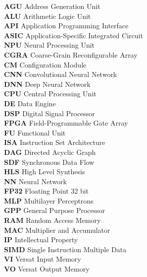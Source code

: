 	\noindent
	\textbf{AGU} Address Generation Unit\\
	\textbf{ALU} Arithmetic Logic Unit\\
	\textbf{API} Application Programming Interface\\
	\textbf{ASIC} Application-Specific Integrated Circuit\\
	\textbf{NPU} Neural Processing Unit \\
	\textbf{CGRA} Coarse-Grain Reconfigurable Array\\
	\textbf{CM} Configuration Module\\
	\textbf{CNN} Convolutional Neural Network\\
	\textbf{DNN} Deep Neural Network\\
	\textbf{CPU} Central Processing Unit\\
	\textbf{DE} Data Engine\\
	\textbf{DSP} Digital Signal Processor\\
	\textbf{FPGA} Field-Programmable Gate Array\\
	\textbf{FU} Functional Unit\\
	\textbf{ISA} Instruction Set Architecture\\
	\textbf{DAG} Directed Acyclic Graph\\
	\textbf{SDF} Synchronous Data Flow\\
	\textbf{HLS} High Level Synthesis\\
	\textbf{NN} Neural Network\\
	\textbf{FP32} Floating Point 32 bit\\
	\textbf{MLP} Multilayer Perceptrons\\
	\textbf{GPP} General Purpose Processor\\
	\textbf{RAM} Random Access Memory\\
	\textbf{MAC} Multiplier and Accumulator\\
	\textbf{IP} Intellectual Property\\
	\textbf{SIMD} Single Instruction Multiple Data\\
	\textbf{VI} Versat Input Memory\\
	\textbf{VO} Versat Output Memory\\


